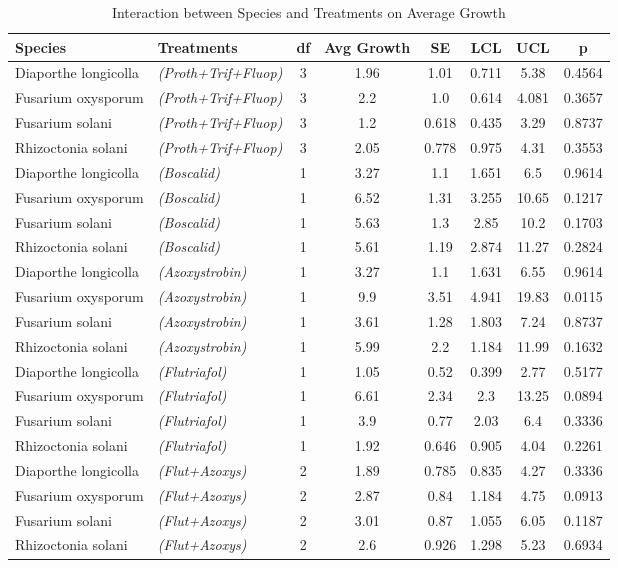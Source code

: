 \documentclass[
  10pt,
  letterpaper,
  twocolumn]{article}
\begin{document}
\begin{table}[ht]
\centering
{}
\caption{Interaction between Species and Treatments on Average Growth}
\begin{tabular}{|l|l|c|c|c|c|c|c|}
\hline
\textbf{Species} & \textbf{Treatments} & \textbf{df} & \textbf{Avg Growth} & \textbf{SE} & \textbf{LCL} & \textbf{UCL} & \textbf{p} \\
\hline
Diaporthe longicolla & \textit{(Proth+Trif+Fluop)} & 3 & 1.96 & 1.01 & 0.711 & 5.38 & 0.4564 \\
Fusarium oxysporum & \textit{(Proth+Trif+Fluop)} & 3 & 2.2 & 1.0 & 0.614 & 4.081 & 0.3657 \\
Fusarium solani & \textit{(Proth+Trif+Fluop)} & 3 & 1.2 & 0.618 & 0.435 & 3.29 & 0.8737 \\
Rhizoctonia solani & \textit{(Proth+Trif+Fluop)} & 3 & 2.05 & 0.778 & 0.975 & 4.31 & 0.3553 \\
\hline
Diaporthe longicolla & \textit{(Boscalid)} & 1 & 3.27 & 1.1 & 1.651 & 6.5 & 0.9614 \\
Fusarium oxysporum & \textit{(Boscalid)} & 1 & 6.52 & 1.31 & 3.255 & 10.65 & 0.1217 \\
Fusarium solani & \textit{(Boscalid)} & 1 & 5.63 & 1.3 & 2.85 & 10.2 & 0.1703 \\
Rhizoctonia solani & \textit{(Boscalid)} & 1 & 5.61 & 1.19 & 2.874 & 11.27 & 0.2824 \\
\hline
Diaporthe longicolla & \textit{(Azoxystrobin)} & 1 & 3.27 & 1.1 & 1.631 & 6.55 & 0.9614 \\
\rowcolor{yellow}
Fusarium oxysporum & \textit{(Azoxystrobin)} & 1 & 9.9 & 3.51 & 4.941 & 19.83 & 0.0115 \\
Fusarium solani & \textit{(Azoxystrobin)} & 1 & 3.61 & 1.28 & 1.803 & 7.24 & 0.8737 \\
Rhizoctonia solani & \textit{(Azoxystrobin)} & 1 & 5.99 & 2.2 & 1.184 & 11.99 & 0.1632 \\
\hline
Diaporthe longicolla & \textit{(Flutriafol)} & 1 & 1.05 & 0.52 & 0.399 & 2.77 & 0.5177 \\
Fusarium oxysporum & \textit{(Flutriafol)} & 1 & 6.61 & 2.34 & 2.3 & 13.25 & 0.0894 \\
Fusarium solani & \textit{(Flutriafol)} & 1 & 3.9 & 0.77 & 2.03 & 6.4 & 0.3336 \\
Rhizoctonia solani & \textit{(Flutriafol)} & 1 & 1.92 & 0.646 & 0.905 & 4.04 & 0.2261 \\
\hline
Diaporthe longicolla & \textit{(Flut+Azoxys)} & 2 & 1.89 & 0.785 & 0.835 & 4.27 & 0.3336 \\
Fusarium oxysporum & \textit{(Flut+Azoxys)} & 2 & 2.87 & 0.84 & 1.184 & 4.75 & 0.0913 \\
Fusarium solani & \textit{(Flut+Azoxys)} & 2 & 3.01 & 0.87 & 1.055 & 6.05 & 0.1187 \\
Rhizoctonia solani & \textit{(Flut+Azoxys)} & 2 & 2.6 & 0.926 & 1.298 & 5.23 & 0.6934 \\
\hline
\hline
\end{tabular}
\end{table}
\end{document}
